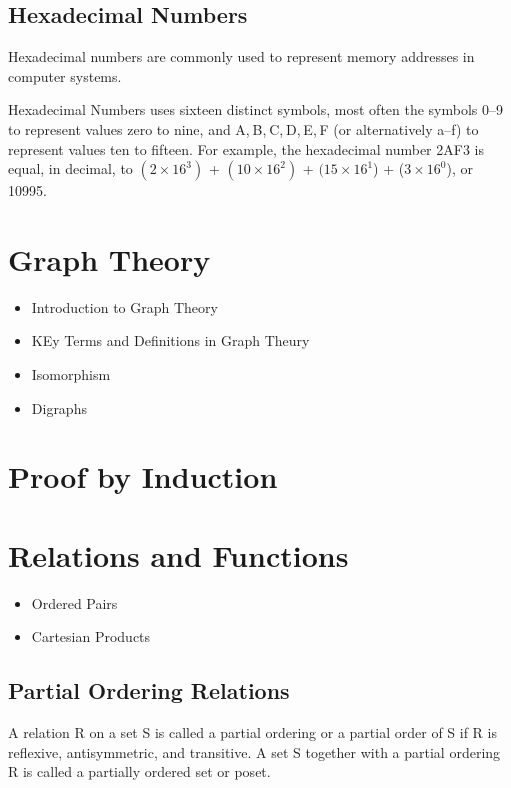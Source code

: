 \subsection*{Hexadecimal Numbers}
Hexadecimal numbers are commonly used to represent memory addresses in computer systems.
 
 
Hexadecimal Numbers uses sixteen distinct symbols, most often the symbols 0–9 to represent values zero to nine, and A, B, C, D, E, F (or alternatively a–f) to represent values ten to fifteen. For example, the hexadecimal number 2AF3 is equal, in decimal, to $(2 \times 16^3)$ + $(10 \times 16^2)$ + $(15 \times 16^1$) + ($3 \times 16^0$), or 10995.

\section{Graph Theory}
\begin{itemize}
\item Introduction to Graph Theory
\item KEy Terms and Definitions in Graph Theury
\item Isomorphism
\item Digraphs
\end{itemize}


\section{Proof by Induction}


\section{Relations and Functions}
\begin{itemize}
\item Ordered Pairs
\item Cartesian Products
\end{itemize}

\subsection*{Partial Ordering Relations}
A relation R on a set S is called a partial ordering or a partial order of S if R is reflexive, antisymmetric, and
transitive. A set S together with a partial ordering R is called a partially ordered set or poset.


